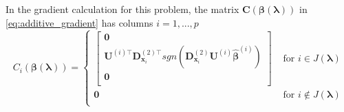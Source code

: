 \documentclass[12pt,letterpaper]{article}
\begin{document}
In the gradient calculation for this problem, the matrix $\boldsymbol C(\boldsymbol \beta( \boldsymbol \lambda))$ in \eqref{eq:additive_gradient} has columns $i = 1,...,p$
\begin{equation}
C_i(\boldsymbol \beta( \boldsymbol \lambda))
= \begin{cases}
\begin{bmatrix}
\boldsymbol{0} \\
\boldsymbol {U}^{(i)\top}  \boldsymbol{D}^{(2)\top}_{\boldsymbol{x}_i} 
sgn( \boldsymbol{D}^{(2)}_{\boldsymbol{x}_i} \boldsymbol {U}^{(i)} \hat{\boldsymbol{\beta}}^{(i)}) \\
\boldsymbol{0} \\
\end{bmatrix}
& \text{ for } i \in J(\boldsymbol \lambda) \\
\boldsymbol{0}
& \text{ for } i \not\in J(\boldsymbol \lambda) \\
\end{cases}
\end{equation}
\end{document}
